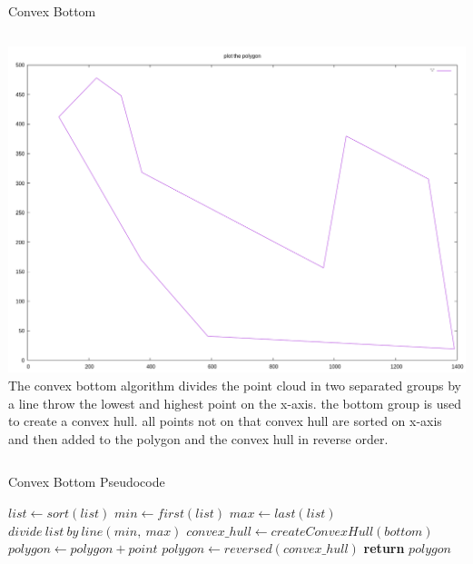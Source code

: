\documentclass{beamer}
\begin{document}
\begin{frame}{Convex Bottom}
  \begin{block}{}
    \begin{columns}[onlytextwidth,T]
      \column{\dimexpr\linewidth-40mm}
      \includegraphics[width=0.5\paperwidth]{figures/kk-convex-bottom-10-0-0.png}
      \column{40mm}
      \small
      The convex bottom algorithm divides the point cloud in two separated
      groups by a line throw the lowest and highest point on the x-axis. the
      bottom group is used to create a convex hull. all points not on that
      convex hull are sorted on x-axis and then added to the polygon and the
      convex hull in reverse order.
    \end{columns}
  \end{block}
\end{frame}

\begin{frame}{Convex Bottom Pseudocode}
  \begin{algorithm}[H]
    \begin{algorithmic}[0]
        \State $list \gets sort(list)$
        \State $min \gets first(list)$
        \State $max \gets last(list)$
        \State $divide\ list\ by\ line(min,\ max)$
        \State $convex\_hull \gets createConvexHull(bottom)$
            \State $polygon \gets polygon + point$
          \EndIf
        \EndFor
        \State $polygon \gets reversed(convex\_hull)$
        \State \textbf{return} $polygon$
      \EndProcedure
    \end{algorithmic}
  \end{algorithm}
\end{frame}
\end{document}
